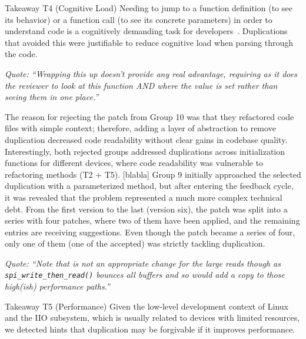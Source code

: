 \documentclass[10pt,conference]{IEEEtran}
\newenvironment{highlight-box}[1]{%
  \begin{tcolorbox}
  \textbf{#1:} \itshape}{\end{tcolorbox}}
\begin{document}
\begin{highlight-box}{Takeaway T4 (Cognitive Load)}
  Needing to jump to a function definition (to see its behavior) or a function
  call (to see its concrete parameters) in order to understand code is a
  cognitively demanding task for developers~\cite{questions-programmers-ask}.
  Duplications that avoided this were justifiable to reduce cognitive load when
  parsing through the code.
\hfill\\

\noindent
\begin{footnotesize}
\textit{
  Quote: ``Wrapping this up doesn't provide any real advantage, requiring as
  it does the reviewer to look at this function AND where the value is set
  rather than seeing them in one place.''
}
\end{footnotesize}
\end{highlight-box}

The reason for rejecting the patch from Group 10 was that they refactored code files with simple context; therefore, adding a layer of abstraction to remove duplication decreased code readability without clear gains in codebase quality. Interestingly, both rejected groups addressed duplications across initialization functions for different devices, where code readability was vulnerable to refactoring methods (T2  + T5). [blabla] Group 9 initially approached the selected duplication with a parameterized method, but after entering the feedback cycle, it was revealed that the problem represented a much more complex technical debt. From the first version to the last (version six), the patch was split into a series with four patches, where two of them have been applied, and the remaining entries are receiving suggestions. Even though the patch became a series of four, only one of them (one of the accepted) was strictly tackling duplication.

\noindent
\begin{footnotesize}
\textit{
  Quote: ``Note that is not an appropriate change for the large reads though
  as \texttt{spi\_write\_then\_read()} bounces all buffers and so would add a
  copy to those high(ish) performance paths.''
}
\end{footnotesize}

\begin{highlight-box}{Takeaway T5 (Performance)}
  Given the low-level development context of Linux and the IIO subsystem, which
  is usually related to devices with limited resources, we detected hints that
  duplication may be forgivable if it improves performance.
\hfill\\
\end{highlight-box}
\end{document}

